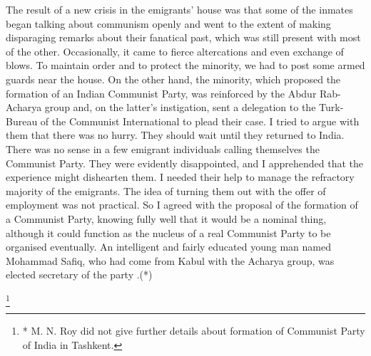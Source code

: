 The result of a new crisis in the emigrants' house was that some of the inmates began talking about communism openly and went to the extent of making disparaging remarks about their fanatical past, which was still present with most of the other. Occasionally, it came to fierce altercations and even exchange of blows. To maintain order and to protect the minority, we had to post some armed guards near the house. On the other hand, the minority, which proposed the formation of an Indian Communist Party, was reinforced by the Abdur Rab-Acharya group and, on the latter's instigation, sent a delegation to the Turk-Bureau of the Communist International to plead their case. I tried to argue with them that there was no hurry. They should wait until they returned to India. There was no sense in a few emigrant individuals calling themselves the Communist Party. They were evidently disappointed, and I apprehended that the experience might dishearten them. I needed their help to manage the refractory majority of the emigrants. The idea of turning them out with the offer of employment was not practical. So I agreed with the proposal of the formation of a Communist Party, knowing fully well that it would be a nominal thing, although it could function as the nucleus of a real Communist Party to be organised eventually. An intelligent and fairly educated young man named Mohammad Safiq, who had come from Kabul with the Acharya group, was elected secretary of the party .(*) 

\footnote{* M. N. Roy did not give further details about formation of Communist 
Party of India in Tashkent. }


